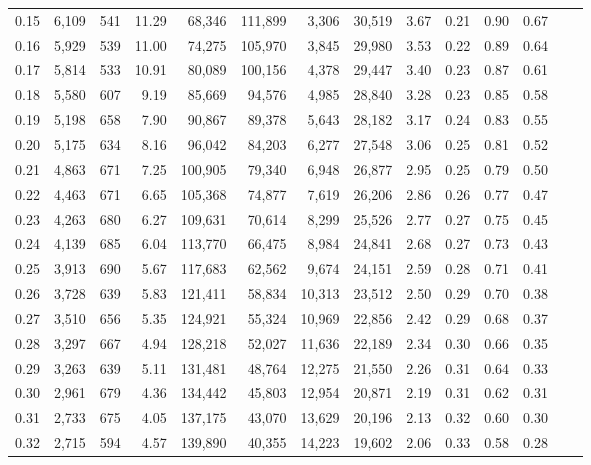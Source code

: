 \begin{tabular}{rrrrrrrrrrrrrr}
0.15 &  6,109 &  541 &   11.29 &   68,346 &  111,899 &   3,306 &  30,519 &  3.67 &  0.21 &  0.90 &      0.67 \\
0.16 &  5,929 &  539 &   11.00 &   74,275 &  105,970 &   3,845 &  29,980 &  3.53 &  0.22 &  0.89 &      0.64 \\
0.17 &  5,814 &  533 &   10.91 &   80,089 &  100,156 &   4,378 &  29,447 &  3.40 &  0.23 &  0.87 &      0.61 \\
0.18 &  5,580 &  607 &    9.19 &   85,669 &   94,576 &   4,985 &  28,840 &  3.28 &  0.23 &  0.85 &      0.58 \\
0.19 &  5,198 &  658 &    7.90 &   90,867 &   89,378 &   5,643 &  28,182 &  3.17 &  0.24 &  0.83 &      0.55 \\
0.20 &  5,175 &  634 &    8.16 &   96,042 &   84,203 &   6,277 &  27,548 &  3.06 &  0.25 &  0.81 &      0.52 \\
0.21 &  4,863 &  671 &    7.25 &  100,905 &   79,340 &   6,948 &  26,877 &  2.95 &  0.25 &  0.79 &      0.50 \\
0.22 &  4,463 &  671 &    6.65 &  105,368 &   74,877 &   7,619 &  26,206 &  2.86 &  0.26 &  0.77 &      0.47 \\
0.23 &  4,263 &  680 &    6.27 &  109,631 &   70,614 &   8,299 &  25,526 &  2.77 &  0.27 &  0.75 &      0.45 \\
0.24 &  4,139 &  685 &    6.04 &  113,770 &   66,475 &   8,984 &  24,841 &  2.68 &  0.27 &  0.73 &      0.43 \\
0.25 &  3,913 &  690 &    5.67 &  117,683 &   62,562 &   9,674 &  24,151 &  2.59 &  0.28 &  0.71 &      0.41 \\
0.26 &  3,728 &  639 &    5.83 &  121,411 &   58,834 &  10,313 &  23,512 &  2.50 &  0.29 &  0.70 &      0.38 \\
0.27 &  3,510 &  656 &    5.35 &  124,921 &   55,324 &  10,969 &  22,856 &  2.42 &  0.29 &  0.68 &      0.37 \\
0.28 &  3,297 &  667 &    4.94 &  128,218 &   52,027 &  11,636 &  22,189 &  2.34 &  0.30 &  0.66 &      0.35 \\
0.29 &  3,263 &  639 &    5.11 &  131,481 &   48,764 &  12,275 &  21,550 &  2.26 &  0.31 &  0.64 &      0.33 \\
0.30 &  2,961 &  679 &    4.36 &  134,442 &   45,803 &  12,954 &  20,871 &  2.19 &  0.31 &  0.62 &      0.31 \\
0.31 &  2,733 &  675 &    4.05 &  137,175 &   43,070 &  13,629 &  20,196 &  2.13 &  0.32 &  0.60 &      0.30 \\
0.32 &  2,715 &  594 &    4.57 &  139,890 &   40,355 &  14,223 &  19,602 &  2.06 &  0.33 &  0.58 &      0.28 \\

\end{tabular}
